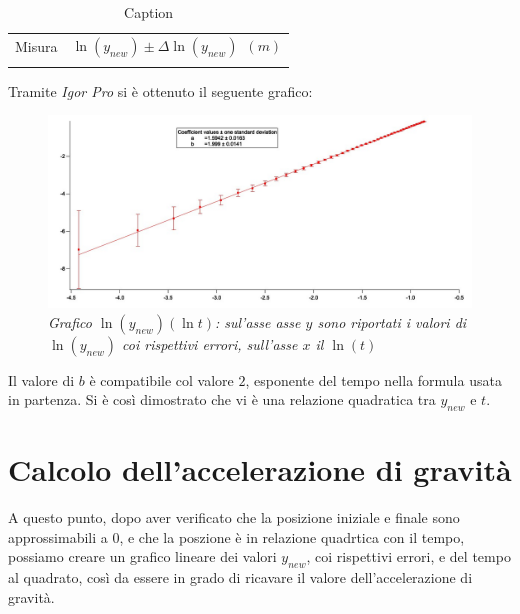 \documentclass[12pt, a4paper]{article}
\begin{document}
\begin{table}[!h]
    \centering
    \begin{tabular}{|c|c|}
    \hline
    \multirow{2}{*}{\small Misura} 
    &\multirow{2}{*}{\small$\ln({y_{new}}) \pm\Delta\ln{(y_{new})}$\ $(m)$} 
     
    \\
    & 
    \\
    \hline
    \hline
       &   \\
    \hline
    \end{tabular}
        \caption{Caption}
        \label{tab:my_label}
\end{table}


 Tramite \textit{Igor Pro} si è ottenuto il seguente grafico:\\
   \begin{figure}[h!]
\centering
\includegraphics[width=170mm]{Immagini/GraphLn.jpg}
\caption{\textit{{\footnotesize{Grafico $\ln{(y_{new})}(\ln{t})$: sul'asse asse $y$ sono riportati i valori di $\ln{(y_{new})}$ coi rispettivi errori, sull'asse $x$ il $\ln{(t)}$}}}}
\label{Grafico logaritmico}
\end{figure}

Il valore di $b$ è compatibile col valore $2$, esponente del tempo nella formula usata in partenza.  Si è così dimostrato che vi è una relazione quadratica tra $y_{new}$ e $t$.





\newpage
\section{Calcolo dell'accelerazione di gravità}
A questo punto, dopo aver verificato che la posizione iniziale e finale sono approssimabili a $0$, e che la poszione è in relazione quadrtica con il tempo, possiamo creare un grafico lineare dei valori $y_{new}$, coi rispettivi errori, e del tempo al quadrato, così da essere in grado di ricavare il valore dell'accelerazione di gravità. 
\end{document}
